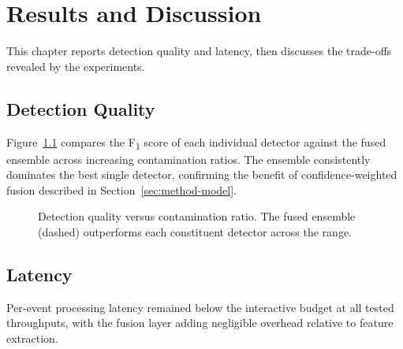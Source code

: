 \documentclass[12pt,a4paper,oneside]{report}
\begin{document}
\chapter{Results and Discussion}
\label{ch:results}

This chapter reports detection quality and latency, then discusses the
trade-offs revealed by the experiments.

\section{Detection Quality}
\label{sec:res-quality}
Figure~\ref{fig:f1} compares the F\textsubscript{1} score of each individual
detector against the fused ensemble across increasing contamination ratios.
The ensemble consistently dominates the best single detector, confirming the
benefit of confidence-weighted fusion described in
Section~\ref{sec:method-model}.

\begin{figure}[ht]
  \centering
  \caption{Detection quality versus contamination ratio. The fused ensemble
           (dashed) outperforms each constituent detector across the range.}
  \label{fig:f1}
\end{figure}

\section{Latency}
\label{sec:res-latency}
Per-event processing latency remained below the interactive budget at all
tested throughputs, with the fusion layer adding negligible overhead relative
to feature extraction.
\end{document}
